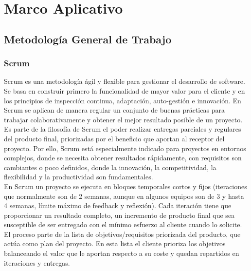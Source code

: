 
\part{Marco Aplicativo}
\chapter{Metodología General de Trabajo}

\section{Scrum}
Scrum es una metodología ágil y flexible para gestionar el desarrollo de software. Se basa en construir primero la funcionalidad de mayor valor para el cliente y en los principios de inspección continua, adaptación, auto-gestión e innovación.\cite{scrumsofteng} En Scrum se aplican de manera regular un conjunto de buenas prácticas para trabajar colaborativamente y obtener el mejor resultado posible de un proyecto.\\

Es parte de la filosofía de Scrum el poder realizar entregas parciales y regulares del producto final, priorizadas por el beneficio que aportan al receptor del proyecto. Por ello, Scrum está especialmente indicado para proyectos en entornos complejos, donde se necesita obtener resultados rápidamente, con requisitos son cambiantes o poco definidos, donde la innovación, la competitividad, la flexibilidad y la productividad son fundamentales.\\

En Scrum un proyecto se ejecuta en bloques temporales cortos y fijos (iteraciones que normalmente son de 2 semanas, aunque en algunos equipos son de 3 y hasta 4 semanas, límite máximo de feedback y reflexión). Cada iteración tiene que proporcionar un resultado completo, un incremento de producto final que sea susceptible de ser entregado con el mínimo esfuerzo al cliente cuando lo solicite. El proceso parte de la lista de objetivos/requisitos priorizada del producto, que actúa como plan del proyecto. En esta lista el cliente prioriza los objetivos balanceando el valor que le aportan respecto a su coste y quedan repartidos en iteraciones y entregas.\\  

